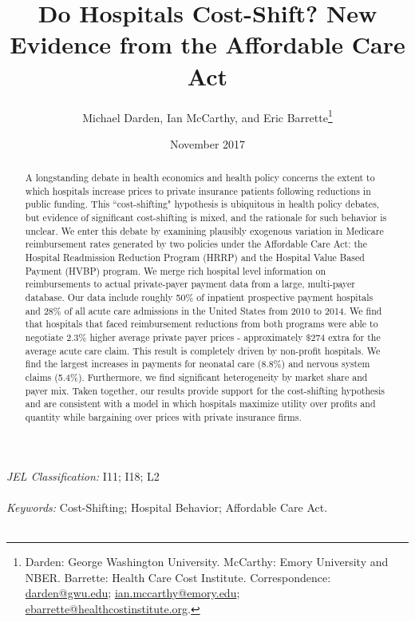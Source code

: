 \documentclass[12pt]{article}
\begin{document}
\title{Do Hospitals Cost-Shift? New Evidence from the Affordable Care Act}
\author{%
  Michael Darden, Ian McCarthy, and Eric Barrette\thanks{Darden: George Washington University. McCarthy: Emory University and NBER. Barrette: Health Care Cost Institute.  Correspondence: \href{mailto:darden@gwu.edu}{darden@gwu.edu}; \href{mailto:ian.mccarthy@emory.edu}{ian.mccarthy@emory.edu}; \href{mailto:ebarrette@healthcostinstitute.org}{ebarrette@healthcostinstitute.org}.}
}
\date{November 2017}

\maketitle

\begin{abstract}
A longstanding debate in health economics and health policy concerns the extent to which hospitals increase prices to private insurance patients following reductions in public funding.  This ``cost-shifting" hypothesis is ubiquitous in health policy debates, but evidence of significant cost-shifting is mixed, and the rationale for such behavior is unclear.  We enter this debate by examining plausibly exogenous variation in Medicare reimbursement rates generated by two policies under the Affordable Care Act: the Hospital Readmission Reduction Program (HRRP) and the Hospital Value Based Payment (HVBP) program.  We merge rich hospital level information on reimbursements to actual private-payer payment  data from a large, multi-payer database.  Our data include roughly 50$\%$ of inpatient prospective payment hospitals and 28$\%$ of all acute care admissions in the United States from 2010 to 2014.  We find that hospitals that faced reimbursement reductions from both programs were able to negotiate 2.3$\%$ higher average private payer prices - approximately $\$$274 extra for the average acute care claim.  This result is completely driven by non-profit hospitals.  We find the largest increases in payments for neonatal care (8.8$\%$) and nervous system claims (5.4$\%$).  Furthermore, we find significant heterogeneity by market share and payer mix.  Taken together, our results provide support for the cost-shifting hypothesis and are consistent with a model in which hospitals maximize utility over profits and quantity while bargaining over prices with private insurance firms.
\end{abstract}
\noindent \textit{JEL Classification:} I11; I18; L2 \\\\
\noindent \textit{Keywords:} Cost-Shifting; Hospital Behavior; Affordable Care Act.\\\\
\end{document}
